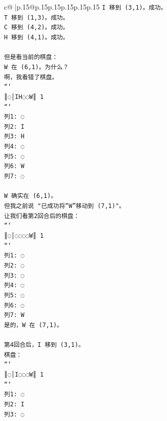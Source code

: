 \documentclass{article}
\begin{document}
{\begin{supertabular}{c@{$\;$}|p{.15\linewidth}@{}p{.15\linewidth}p{.15\linewidth}p{.15\linewidth}p{.15\linewidth}p{.15\linewidth}}
{{{\texttt{I 移到 (3,1)。成功。} \\
\texttt{T 移到 (1,3)。成功。} \\
\texttt{C 移到 (4,2)。成功。} \\
\texttt{H 移到 (4,1)。成功。} \\
\\ 
\texttt{但是看当前的棋盘：} \\
\texttt{W 在 (6,1)。为什么？} \\
\texttt{啊，我看错了棋盘。} \\
\texttt{```} \\
\texttt{║◌│IH◌◌W║ 1} \\
\texttt{```} \\
\texttt{列1: ◌} \\
\texttt{列2: I} \\
\texttt{列3: H} \\
\texttt{列4: ◌} \\
\texttt{列5: ◌} \\
\texttt{列6: W} \\
\texttt{列7: ◌} \\
\\ 
\texttt{W 确实在 (6,1)。} \\
\texttt{但我之前说 "已成功将“W”移动到 (7,1)"。} \\
\texttt{让我们看第2回合后的棋盘：} \\
\texttt{```} \\
\texttt{║◌│◌◌◌◌W║ 1} \\
\texttt{```} \\
\texttt{列1: ◌} \\
\texttt{列2: ◌} \\
\texttt{列3: ◌} \\
\texttt{列4: ◌} \\
\texttt{列5: ◌} \\
\texttt{列6: ◌} \\
\texttt{列7: W} \\
\texttt{是的，W 在 (7,1)。} \\
\\ 
\texttt{第4回合后，I 移到 (3,1)。} \\
\texttt{棋盘：} \\
\texttt{```} \\
\texttt{║◌│I◌◌◌W║ 1} \\
\texttt{```} \\
\texttt{列1: ◌} \\
\texttt{列2: I} \\
\texttt{列3: ◌} \\
}}}
\end{supertabular}}
\end{document}
